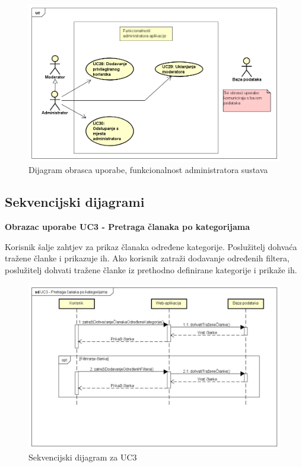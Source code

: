 \begin{figure}[H]
	\includegraphics[scale=0.4]{slike/DijagramObrazacaUporabe3.PNG}
	\centering
	\caption{Dijagram obrasca uporabe, funkcionalnost administratora sustava}
	\label{fig:obrazac_uporabe3}
\end{figure}

\eject	

\subsection{Sekvencijski dijagrami}

\textbf{Obrazac uporabe UC3 - Pretraga članaka po kategorijama}

Korisnik šalje zahtjev za prikaz članaka određene kategorije. Poslužitelj dohvaća tražene članke i prikazuje ih.
Ako korisnik zatraži dodavanje određenih filtera, poslužitelj dohvati tražene članke iz prethodno definirane kategorije i prikaže ih.

\begin{figure}[H]
	\includegraphics[scale=0.6]{slike/SekvencijskiDijagramUC3.jpg}
	\centering
	\caption{Sekvencijski dijagram za UC3}
	\label{fig:sekvencijski_dijagram_uc3}
\end{figure}

